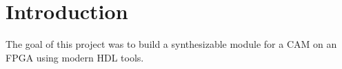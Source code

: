 \section{Introduction}
The goal of this project was to build a synthesizable module for a CAM on an FPGA using modern HDL tools.